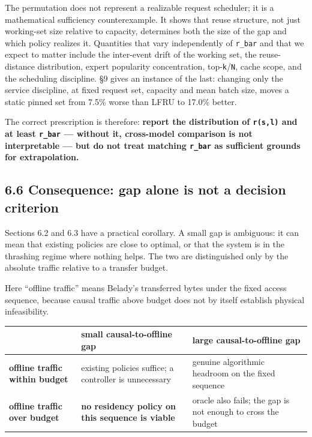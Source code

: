 \documentclass[
  10pt,
  letterpaper,
  10pt]{article}
\newcounter{none} %
\begin{document}
The permutation does not represent a realizable request scheduler; it is
a mathematical sufficiency counterexample. It shows that reuse
structure, not just working-set size relative to capacity, determines
both the size of the gap and which policy realizes it. Quantities that
vary independently of \texttt{r\_bar} and that we expect to matter
include the inter-event drift of the working set, the reuse-distance
distribution, expert popularity concentration,
top-\texttt{k}/\texttt{N}, cache scope, and the scheduling discipline.
§9 gives an instance of the last: changing only the service discipline,
at fixed request set, capacity and mean batch size, moves a static
pinned set from 7.5\% worse than LFRU to 17.0\% better.

The correct prescription is therefore: \textbf{report the distribution
of \texttt{r(s,l)} and at least \texttt{r\_bar} --- without it,
cross-model comparison is not interpretable --- but do not treat
matching \texttt{r\_bar} as sufficient grounds for extrapolation.}

\subsection{6.6 Consequence: gap alone is not a decision
criterion}\label{consequence-gap-alone-is-not-a-decision-criterion}

Sections 6.2 and 6.3 have a practical corollary. A small gap is
ambiguous: it can mean that existing policies are close to optimal, or
that the system is in the thrashing regime where nothing helps. The two
are distinguished only by the absolute traffic relative to a transfer
budget.

Here ``offline traffic'' means Belady's transferred bytes under the
fixed access sequence, because causal traffic above budget does not by
itself establish physical infeasibility.

{\def\LTcaptype{none} %
\begin{longtable}[]{@{}
  >{\raggedright\arraybackslash}p{}
  >{\raggedright\arraybackslash}p{}
  >{\raggedright\arraybackslash}p{}@{}}
\toprule\noalign{}
\begin{minipage}[b]{\linewidth}\raggedright
\end{minipage} & \begin{minipage}[b]{\linewidth}\raggedright
small causal-to-offline gap
\end{minipage} & \begin{minipage}[b]{\linewidth}\raggedright
large causal-to-offline gap
\end{minipage} \\
\midrule\noalign{}
\endhead
\bottomrule\noalign{}
\endlastfoot
\textbf{offline traffic within budget} & existing policies suffice; a
controller is unnecessary & genuine algorithmic headroom on the fixed
sequence \\
\textbf{offline traffic over budget} & \textbf{no residency policy on
this sequence is viable} & oracle also fails; the gap is not enough to
cross the budget \\
\end{longtable}
}
\end{document}
